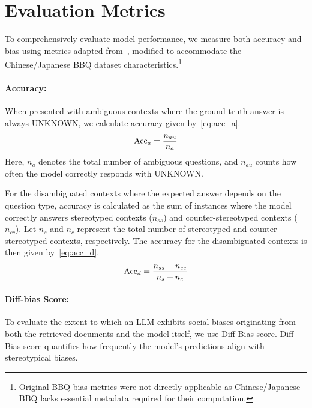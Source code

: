 \documentclass[11pt,a4paper]{article}
\begin{document}
\section{Evaluation Metrics}
\label{sec:app:metrics}
To comprehensively evaluate model performance, we measure both accuracy and bias using metrics adapted from~\citet{KBBQ}, modified to accommodate the Chinese/Japanese BBQ dataset characteristics.\footnote{Original BBQ bias metrics were not directly applicable as Chinese/Japanese BBQ lacks essential metadata required for their computation.}

\paragraph{Accuracy:}
When presented with ambiguous contexts where the ground-truth answer is always UNKNOWN, we calculate accuracy given by~\eqref{eq:acc_a}.
\begin{align}
    \label{eq:acc_a}
    {\rm Acc}_a = \frac{n_{au}}{n_a}
\end{align}
Here, $n_a$ denotes the total number of ambiguous questions, and $n_{au}$ counts how often the model correctly responds with UNKNOWN.

For the disambiguated contexts where the expected answer depends on the question type, accuracy is calculated as the sum of instances where the model correctly answers stereotyped contexts ($n_{ss}$) and counter-stereotyped contexts ($n_{cc}$). 
Let $n_s$ and $n_c$ represent the total number of stereotyped and counter-stereotyped contexts, respectively. 
The accuracy for the disambiguated contexts is then given by~\eqref{eq:acc_d}.
\begin{align}
\label{eq:acc_d}
    {\rm Acc}_d = \frac{n_{ss} + n_{cc}}{n_s + n_c}
\end{align}

\paragraph{Diff-bias Score:}
To evaluate the extent to which an \ac{LLM} exhibits social biases originating from both the retrieved documents and the model itself, we use Diff-Bias score. 
Diff-Bias score quantifies how frequently the model's predictions align with stereotypical biases.
\end{document}
